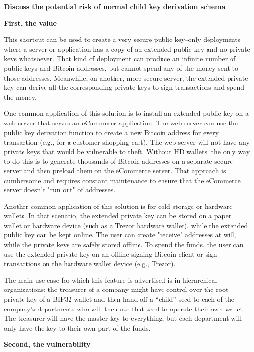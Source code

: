 \bigskip
{\textbf{Discuss the potential risk of normal child key derivation schema}}
\label{bip32vul}
\begin{adjustwidth}{1cm}{}
    \bigskip
    {\textbf{First, the value}}

    This shortcut can be used to create a very secure public key–only deployments where a server or application has a copy of an extended public key and no private keys whatsoever. That kind of deployment can produce an infinite number of public keys and Bitcoin addresses, but cannot spend any of the money sent to those addresses. Meanwhile, on another, more secure server, the extended private key can derive all the corresponding private keys to sign transactions and spend the money.

    One common application of this solution is to install an extended public key on a web server that serves an eCommerce application. The web server can use the public key derivation function to create a new Bitcoin address for every transaction (e.g., for a customer shopping cart). The web server will not have any private keys that would be vulnerable to theft. Without HD wallets, the only way to do this is to generate thousands of Bitcoin addresses on a separate secure server and then preload them on the eCommerce server. That approach is cumbersome and requires constant maintenance to ensure that the eCommerce server doesn’t "run out" of addresses.

    Another common application of this solution is for cold storage or hardware wallets. In that scenario, the extended private key can be stored on a paper wallet or hardware device (such as a Trezor hardware wallet), while the extended public key can be kept online. The user can create "receive" addresses at will, while the private keys are safely stored offline. To spend the funds, the user can use the extended private key on an offline signing Bitcoin client or sign transactions on the hardware wallet device (e.g., Trezor).

    The main use case for which this feature is advertised is in hierarchical organizations: the treasurer of a company might have control over the root private key of a BIP32 wallet and then hand off a “child” seed to each of the company’s departments who will then use that seed to operate their own wallet. The treasurer will have the master key to everything, but each department will only have the key to their own part of the funds.

    \bigskip
    {\textbf{Second, the vulnerability}}


\end{adjustwidth}
